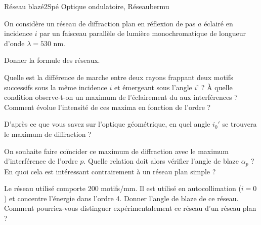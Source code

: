 \begin{exercise}{Réseau blazé}{2}{Spé}
{Optique ondulatoire, Réseau}{bermu}

On considère un réseau de diffraction plan en réflexion de pas $a$ éclairé en incidence $i$ par un faisceau parallèle de lumière monochromatique de longueur d'onde $\lambda = 530$ nm.

\begin{questions}

\questioncours Donner la formule des réseaux.

\question Quelle est la différence de marche entre deux rayons frappant deux motifs successifs sous la même incidence $i$ et émergeant sous l’angle $i’$ ? \`A quelle condition observe-t-on un maximum de l’éclairement du aux interférences ? Comment évolue l'intensité de ces maxima en fonction de l'ordre ?


\question D'après ce que vous savez sur l'optique géométrique, en quel angle $i_0'$ se trouvera le maximum de diffraction ?

\question On souhaite faire coïncider ce maximum de diffraction avec le maximum d'interférence de l'ordre $p$. Quelle relation doit alors vérifier l'angle de blaze $\alpha_p$ ? En quoi cela est intéressant contrairement à un réseau plan simple ?

\question Le réseau utilisé comporte 200 motifs/mm. Il est utilisé en autocollimation ($i=0$) et concentre l’énergie
dans l’ordre 4. Donner l'angle de blaze de ce réseau. Comment pourriez-vous distinguer expérimentalement ce réseau d’un réseau plan ?

\end{questions}
\end{exercise} 

